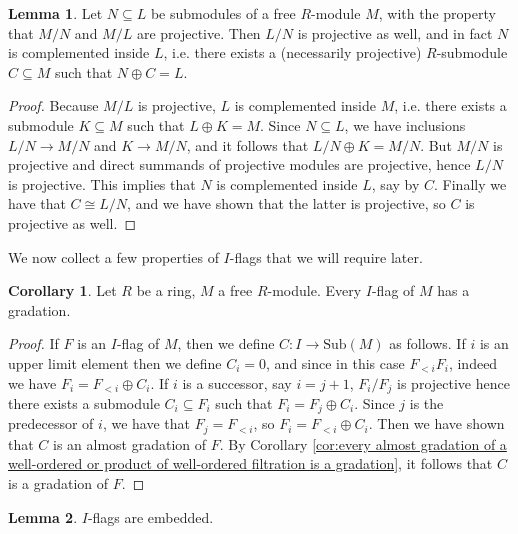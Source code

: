 \documentclass[oneside,11pt]{amsart}
\newcommand{\Sub}{\ensuremath{\text{Sub}}}
\theoremstyle{definition}
\newtheorem{proof techniques}{Proof Techniques}
\newtheorem{lemma}{Lemma}
\newtheorem{corollary}{Corollary}
\begin{document}
\begin{lemma}\label{lem: nested complemented submodules are locally complemented}
Let $N \subseteq L$ be submodules of a free $R$-module $M$, with the property that $M / N$ and $M / L$ are projective. Then $L / N$ is projective as well, and in fact $N$ is complemented inside $L$, i.e. there exists a (necessarily projective) $R$-submodule $C \subseteq M$ such that $N \oplus C = L$. 
\end{lemma}

\begin{proof}
Because $M / L$ is projective, $L$ is complemented inside $M$, i.e. there exists a submodule $K \subseteq M$ such that $L \oplus K = M$. Since $N \subseteq L$, we have inclusions $L / N \to M / N$ and $K \to M / N$, and it follows that $L / N \oplus K = M / N$. But $M / N$ is projective and direct summands of projective modules are projective, hence $L / N$ is projective. This implies that $N$ is complemented inside $L$, say by $C$. Finally we have that $C \cong L / N$, and we have shown that the latter is projective, so $C$ is projective as well.  
\end{proof}

We now collect a few properties of $I$-flags that we will require later. 

\begin{corollary}\label{cor: I-flags have gradations}
Let $R$ be a ring, $M$ a free $R$-module. Every $I$-flag of $M$ has a gradation. 
\end{corollary}

\begin{proof}
If $F$ is an $I$-flag of $M$, then we define $C : I \to \Sub(M)$ as follows. If $i$ is an upper limit element then we define $C_i = 0$, and since in this case $F_{<i} F_i$, indeed we have $F_i = F_{<i} \oplus C_i$. If $i$ is a successor, say $i = j + 1$, $F_i / F_j$ is projective hence there exists a submodule $C_i \subseteq F_i$ such that $F_i = F_j \oplus C_i$. Since $j$ is the predecessor of $i$, we have that $F_j= F_{<i}$, so $F_i = F_{<i} \oplus C_i$. Then we have shown that $C$ is an almost gradation of $F$. By Corollary \ref{cor:every almost gradation of a well-ordered or product of well-ordered filtration is a gradation}, it follows that $C$ is a gradation of $F$. 
\end{proof}

\begin{lemma}\label{lem: flags are embedded}
$I$-flags are embedded.
\end{lemma}
\end{document}
